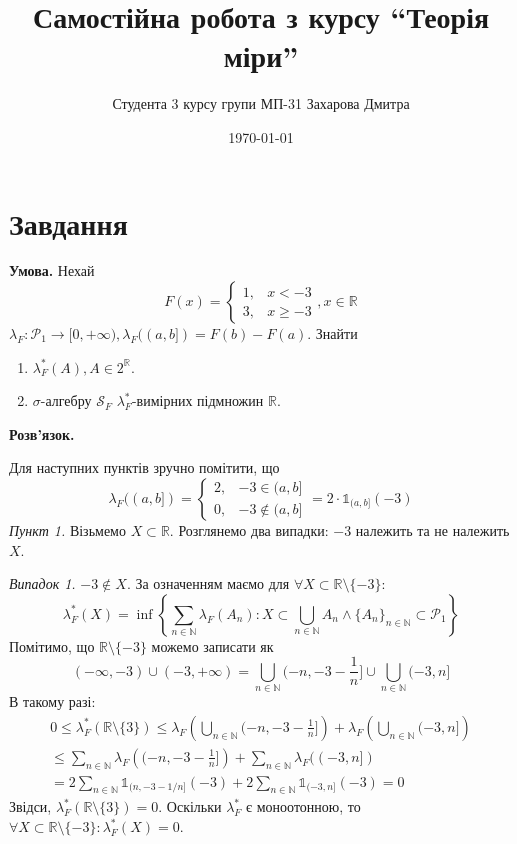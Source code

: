 \documentclass[14pt]{extarticle}
\title{Самостійна робота з курсу ``Теорія міри''}
\author{Студента 3 курсу групи МП-31 Захарова Дмитра}
\date{\today}
\begin{document}
\maketitle

\section*{Завдання}
\textbf{Умова.} Нехай
\[
F(x) = \begin{cases}
    1, & x < -3 \\
    3, & x \geq -3
\end{cases}, x \in \mathbb{R}
\]
$\lambda_F: \mathcal{P}_1 \to [0,+\infty),\lambda_F((a,b])=F(b)-F(a)$. Знайти
\begin{enumerate}
    \item $\lambda_F^*(A), A \in 2^{\mathbb{R}}$.
    \item $\sigma$-алгебру $\mathcal{S}_F$ $\lambda_F^*$-вимірних підмножин $\mathbb{R}$.
\end{enumerate}

\textbf{Розв'язок.} 

Для наступних пунктів зручно помітити, що
\[
\lambda_F((a,b]) = \begin{cases}
    2, & -3 \in (a,b]\\
    0, & -3 \not \in (a,b]
\end{cases} = 2 \cdot \mathds{1}_{(a,b]}(-3)
\]
\textit{Пункт 1.}  Візьмемо $X \subset \mathbb{R}$. Розглянемо два випадки: $-3$ належить та не належить $X$.

\textit{Випадок 1.} $-3 \not \in X$. За означенням маємо для $\forall X \subset \mathbb{R} \setminus \{-3\}$:
\[
\lambda^*_F(X) = 
    \inf\left\{\sum_{n \in \mathbb{N}}\lambda_F(A_n): X \subset \bigcup_{n \in \mathbb{N}}A_n \wedge \{A_n\}_{n \in \mathbb{N}} \subset \mathcal{P}_1\right\}
\]
Помітимо, що $\mathbb{R} \setminus \{-3\}$ можемо записати як
\[
(-\infty,-3) \cup (-3,+\infty) = \bigcup_{n \in \mathbb{N}} (-n, -3-\frac{1}{n}\Big] \cup \bigcup_{n \in \mathbb{N}} (-3,n]
\]
В такому разі:
\begin{gather*}
0 \leq \lambda_F^*(\mathbb{R} \setminus \{3\}) \leq \lambda_F\left(\bigcup_{n \in \mathbb{N}} (-n, -3-\frac{1}{n}\Big]\right) + \lambda_F\left(\bigcup_{n \in \mathbb{N}}(-3,n]\right) \\
\leq \sum_{n \in \mathbb{N}}\lambda_F\left((-n,-3-\frac{1}{n}\Big]\right) + \sum_{n \in \mathbb{N}} \lambda_F((-3,n]) \\
= 2\sum_{n \in \mathbb{N}}\mathds{1}_{(n,-3-1/n]}(-3) + 2\sum_{n \in \mathbb{N}}\mathds{1}_{(-3,n]}(-3) = 0
\end{gather*}
Звідси, $\lambda_F^*(\mathbb{R} \setminus \{3\}) = 0$. Оскільки $\lambda_F^*$ є моноотонною, то $\forall X \subset \mathbb{R} \setminus \{-3\}: \lambda_F^*(X)=0$. 
\end{document}
